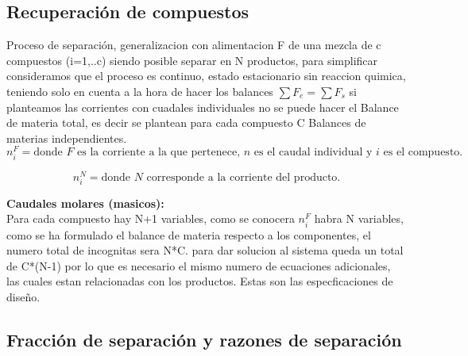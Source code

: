 \documentclass{report}
\begin{document}
\subsection{Recuperación de compuestos}
\begin{raggedright}
	Proceso de separación, generalizacion con alimentacion F de una mezcla de c compuestos (i=1,..c) siendo posible separar en N productos, para simplificar consideramos que el proceso es continuo, estado estacionario
	sin reaccion quimica, teniendo solo en cuenta a la hora de hacer los balances $\sum F_e = \sum F_s$ si planteamos las corrientes con cuadales individuales no se puede hacer el Balance de materia total, es decir se plantean para cada compuesto  C Balances de materias independientes.
	\begin{equation*}
		n^F_i = \text{donde } F \text{ es la corriente a la que pertenece, } n \text{ es el caudal individual y } i \text{ es el compuesto.}
	\end{equation*}
	
	\begin{equation*}
		n^N_i = \text{donde } N \text{ corresponde a la corriente del producto.}
	\end{equation*}
	
\textbf{Caudales molares (masicos):}\\
Para cada compuesto hay N+1 variables, como se conocera $n_i^F$ habra N variables, como se ha formulado el balance de materia respecto a los componentes, el numero total de incognitas sera N*C. para dar solucion al sistema queda un total de C*(N-1)
por lo que es necesario el mismo numero de ecuaciones adicionales, las cuales estan relacionadas con los productos. Estas son las especficaciones de diseño.

\end{raggedright}

\subsection{Fracción de separación y razones de separación}
\end{document}
